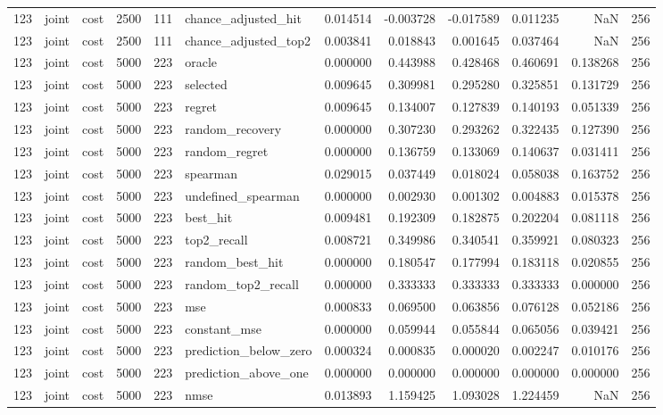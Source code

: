 \begin{tabular}{rllrrlrrrrrr}
123 & joint & cost & 2500 & 111 & chance_adjusted_hit & 0.014514 & -0.003728 & -0.017589 & 0.011235 & NaN & 256 \\
123 & joint & cost & 2500 & 111 & chance_adjusted_top2 & 0.003841 & 0.018843 & 0.001645 & 0.037464 & NaN & 256 \\
123 & joint & cost & 5000 & 223 & oracle & 0.000000 & 0.443988 & 0.428468 & 0.460691 & 0.138268 & 256 \\
123 & joint & cost & 5000 & 223 & selected & 0.009645 & 0.309981 & 0.295280 & 0.325851 & 0.131729 & 256 \\
123 & joint & cost & 5000 & 223 & regret & 0.009645 & 0.134007 & 0.127839 & 0.140193 & 0.051339 & 256 \\
123 & joint & cost & 5000 & 223 & random_recovery & 0.000000 & 0.307230 & 0.293262 & 0.322435 & 0.127390 & 256 \\
123 & joint & cost & 5000 & 223 & random_regret & 0.000000 & 0.136759 & 0.133069 & 0.140637 & 0.031411 & 256 \\
123 & joint & cost & 5000 & 223 & spearman & 0.029015 & 0.037449 & 0.018024 & 0.058038 & 0.163752 & 256 \\
123 & joint & cost & 5000 & 223 & undefined_spearman & 0.000000 & 0.002930 & 0.001302 & 0.004883 & 0.015378 & 256 \\
123 & joint & cost & 5000 & 223 & best_hit & 0.009481 & 0.192309 & 0.182875 & 0.202204 & 0.081118 & 256 \\
123 & joint & cost & 5000 & 223 & top2_recall & 0.008721 & 0.349986 & 0.340541 & 0.359921 & 0.080323 & 256 \\
123 & joint & cost & 5000 & 223 & random_best_hit & 0.000000 & 0.180547 & 0.177994 & 0.183118 & 0.020855 & 256 \\
123 & joint & cost & 5000 & 223 & random_top2_recall & 0.000000 & 0.333333 & 0.333333 & 0.333333 & 0.000000 & 256 \\
123 & joint & cost & 5000 & 223 & mse & 0.000833 & 0.069500 & 0.063856 & 0.076128 & 0.052186 & 256 \\
123 & joint & cost & 5000 & 223 & constant_mse & 0.000000 & 0.059944 & 0.055844 & 0.065056 & 0.039421 & 256 \\
123 & joint & cost & 5000 & 223 & prediction_below_zero & 0.000324 & 0.000835 & 0.000020 & 0.002247 & 0.010176 & 256 \\
123 & joint & cost & 5000 & 223 & prediction_above_one & 0.000000 & 0.000000 & 0.000000 & 0.000000 & 0.000000 & 256 \\
123 & joint & cost & 5000 & 223 & nmse & 0.013893 & 1.159425 & 1.093028 & 1.224459 & NaN & 256 \\

\end{tabular}
